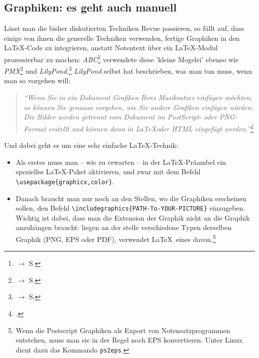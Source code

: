 %
%
%


\subsection{Graphiken: es geht auch manuell}
\label{IncludeGraphics}

Lässt man die bisher diskutierten Techniken Revue passieren, so fällt auf, dass
einige von ihnen die generelle Techniken verwenden, fertige Graphiken in den
\LaTeX-Code zu integrieren, anstatt Notentext über ein \LaTeX-Modul prozessierbar
zu machen: \textit{ABC}\footnote{$\rightarrow$ S. \pageref{AbcGraphics}}
verwendete diese 'kleine Mogelei' ebenso wie \textit{PMX}\footnote{$\rightarrow$
S. \pageref{PmxGraphics}} und \textit{LilyPond}.\footnote{$\rightarrow$ S.
\pageref{LilyPondGraphics}} \textit{LilyPond} selbst hat beschrieben, was man tun
muss, wenn man so vorgehen will:

\begin{quote}\textit{\enquote{Wenn Sie in ein Dokument Grafiken Ihres
Musiksatzes einfügen möchten, so können Sie genauso vorgehen, wie Sie andere
Grafiken einfügen würden: Die Bilder werden getrennt vom Dokument im PostScript-
oder PNG-Format erstellt und können dann in \LaTeX oder HTML eingefügt
werden.}\footcite[vgl.][20]{LilyPond2018e} }\end{quote}

Und dabei geht es um eine sehr einfache \LaTeX-Technik:

\begin{itemize}
  \item Als erstes muss man -- wie zu erwarten -- in der \LaTeX-Präambel ein
  spezielles \LaTeX-Paket aktivieren, und zwar mit dem Befehl
  \texttt{\textbackslash{usepackage}\{graphicx,color\}}.
  \item Danach braucht man nur noch an den Stellen, wo die Graphiken erscheinen
  sollen, den Befehl
  \texttt{\textbackslash{includegraphics}\{PATH-To-YOUR-PICTURE\}} einzugeben.
  Wichtig ist dabei, dass man die Extension der Graphik nicht an die Graphik
  anzuhängen braucht: liegen an der stelle verschiedene Typen derselben Graphik
  (PNG, EPS oder PDF), verwendet \LaTeX\ eines davon.\footnote{Wenn die Postscript
  Graphiken als Export von Notensatzprogrammen entstehen, muss man sie in der
  Regel noch EPS konvertieren. Unter Linux dient dazu das Kommando \texttt{ps2eps}.}
\end{itemize}


